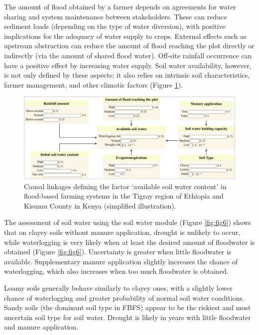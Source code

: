 \documentclass[]{elsarticle} %
\begin{document}
The amount of flood obtained by a farmer depends on agreements for water sharing and system maintenance between stakeholders. These can reduce sediment loads (depending on the type of water diversion), with positive implications for the adequacy of water supply to crops. External effects such as upstream abstraction can reduce the amount of flood reaching the plot directly or indirectly (via the amount of shared flood water). Off-site rainfall occurrence can have a positive effect by increasing water supply. Soil water availability, however, is not only defined by these aspects; it also relies on intrinsic soil characteristics, farmer management, and other climatic factors (Figure \ref{fig:fig5}).

\begin{figure}[!h]

{\centering \includegraphics[width=1\linewidth,]{Modelling_FBFS_files/figure-latex/fig5-plot-1} 

}

\caption{Causal linkages defining the factor ‘available soil water content’ in flood-based farming systems in the Tigray region of Ethiopia and Kisumu County in Kenya (simplified illustration).}\label{fig:fig5}
\end{figure}

The assessment of soil water using the soil water module (Figure \ref{fig:fig6}) shows that on clayey soils without manure application, drought is unlikely to occur, while waterlogging is very likely when at least the desired amount of floodwater is obtained (Figure \ref{fig:fig6}). Uncertainty is greater when little floodwater is available. Supplementary manure application slightly increases the chance of waterlogging, which also increases when too much floodwater is obtained.

Loamy soils generally behave similarly to clayey ones, with a slightly lower chance of waterlogging and greater probability of normal soil water conditions. Sandy soils (the dominant soil type in FBFS) appear to be the riskiest and most uncertain soil type for soil water. Drought is likely in years with little floodwater and manure application.
\end{document}
